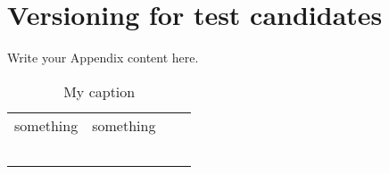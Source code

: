 
\chapter{Versioning for test candidates} %

\label{AppendixA} %


Write your Appendix content here.

\begin{table}[h!]
\centering
\begin{tabular}{l*{2}{l}r}
\hline
something& something  \\
 &  \\
 &  \\
 &  \\
 &  \\
 & \\
\hline
\end{tabular}
\caption{My caption}
\label{my-label}
\end{table}

